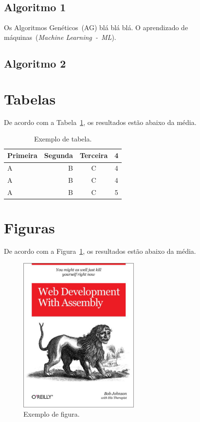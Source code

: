 \documentclass[12pt]{article}
\begin{document}
\subsection{Algoritmo 1}
\label{sec_alg1}

Os Algoritmos Genéticos~(AG) blá blá blá. O aprendizado de máquinas~(\textit{Machine Learning~-~ML}).


\subsection{Algoritmo 2}
\label{sec_alg2}


\section{Tabelas}

De acordo com a Tabela~\ref{tab_exemplo}, os resultados estão abaixo da média.

\begin{table}[h]
  \centering
  \begin{tabular}{l||r|c|c}
    \textbf{Primeira}  & \textbf{Segunda}  & \textbf{Terceira} & \textbf{4} \\
    \hline\hline
    A & B & C & 4\\ \hline
    A & B & C & 4\\ \hline
    A & B & C & 5\\ \hline
  \end{tabular}
 \caption{Exemplo de tabela.}
 \label{tab_exemplo}

\end{table}

\section{Figuras}

De acordo com a Figura~\ref{fig_exemplo}, os resultados estão abaixo da média. 

\begin{figure}[h]
  \centering
  \includegraphics[width=6cm]{exemplo.jpg}
 \caption{Exemplo de figura.}
 \label{fig_exemplo}
\end{figure}
\end{document}
